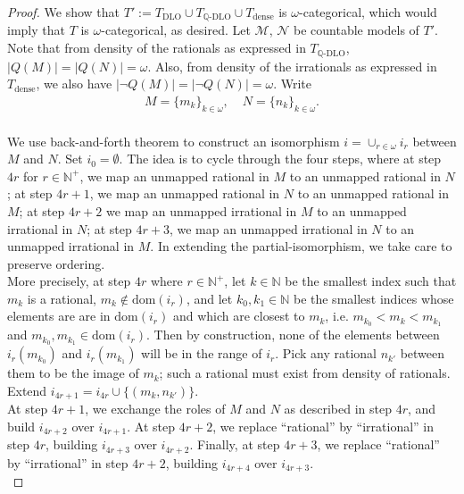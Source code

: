 \documentclass{article}
\begin{document}
\begin{enumerate}[label={\bf Q\arabic*:}]
\begin{proof}
      We show that $T':=T_\text{DLO}\cup T_{\mathbb{Q}\text{-DLO}}\cup
      T_{\text{dense}}$ is $\omega$-categorical, which would imply that $T$
      is $\omega$-categorical, as desired. Let $\mathcal{M}$, $\mathcal{N}$
      be countable models of $T'$. Note that from density of the rationals
      as expressed in $T_{\mathbb{Q}\text{-DLO}}$,
      $|Q(M)|=|Q(N)|=\omega$. Also, from density of the irrationals as
      expressed in $T_{\text{dense}}$, we also have $|\neg Q(M)|=|\neg
      Q(N)|=\omega$. Write
      \[\begin{array}{ll}
        M=\{m_k\}_{k\in\omega},\; &N=\{n_k\}_{k\in\omega}.
        \\
      \end{array}\]

      We use back-and-forth theorem to construct an isomorphism
      $i=\cup_{r\in\omega}i_r$ between $M$ and $N$. Set $i_0=\emptyset$.
      The idea is to cycle through the four steps, where at step $4r$ for
      $r\in\mathbb{N}^+$, we map an unmapped rational in $M$ to an unmapped
      rational in $N$; at step $4r+1$, we map an unmapped rational in $N$
      to an unmapped rational in $M$; at step $4r+2$ we map an unmapped
      irrational in $M$ to an unmapped irrational in $N$; at step $4r+3$,
      we map an unmapped irrational in $N$ to an unmapped irrational in
      $M$. In extending the partial-isomorphism, we take care to preserve
      ordering. \\

      More precisely, at step $4r$ where $r\in\mathbb{N}^+$, let
      $k\in\mathbb{N}$ be the smallest index such that $m_k$ is a rational,
      $m_k\not\in\text{dom}(i_r)$, and let $k_0,k_1\in\mathbb{N}$ be the
      smallest indices whose elements are are in $\text{dom}(i_r)$ and
      which are closest to $m_k$, i.e. $m_{k_0}<m_k<m_{k_1}$ and
      $m_{k_0},m_{k_1}\in\text{dom}(i_r)$. Then by construction, none of
      the elements between $i_r(m_{k_0})$ and $i_r(m_{k_1})$ will be in the
      range of $i_r$. Pick any rational $n_{k'}$ between them to be the
      image of $m_k$; such a rational must exist from density of rationals.
      Extend $i_{4r+1}=i_{4r}\cup\{(m_k,n_{k'})\}$. \\

      At step $4r+1$, we exchange the roles of $M$ and $N$ as described in
      step $4r$, and build $i_{4r+2}$ over $i_{4r+1}$. At step $4r+2$, we
      replace ``rational'' by ``irrational'' in step $4r$, building
      $i_{4r+3}$ over $i_{4r+2}$. Finally, at step $4r+3$, we replace
      ``rational'' by ``irrational'' in step $4r+2$, building $i_{4r+4}$
      over $i_{4r+3}$. \\


\end{proof}
\end{enumerate}
\end{document}
